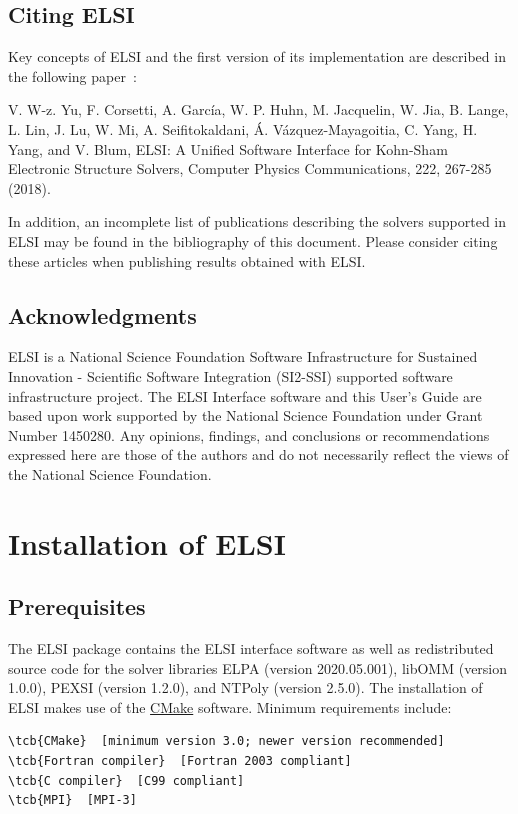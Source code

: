\documentclass{report}
\newcommand{\tcb}[1]{\textcolor{blue}{#1}}
\begin{document}
\section{Citing ELSI}
\label{sec:cite}
Key concepts of ELSI and the first version of its implementation are described in the following paper~\cite{elsi_yu_2018}:

V. W-z. Yu, F. Corsetti, A. Garc\'{i}a, W. P. Huhn, M. Jacquelin, W. Jia, B. Lange, L. Lin, J. Lu, W. Mi, A. Seifitokaldani, \'{A}. V\'{a}zquez-Mayagoitia, C. Yang, H. Yang, and V. Blum, ELSI: A Unified Software Interface for Kohn-Sham Electronic Structure Solvers, Computer Physics Communications, 222, 267-285 (2018).

In addition, an incomplete list of publications describing the solvers supported in ELSI may be found in the bibliography of this document. Please consider citing these articles when publishing results obtained with ELSI.

\section{Acknowledgments}
\label{sec:thanks}
ELSI is a National Science Foundation Software Infrastructure for Sustained Innovation - Scientific Software Integration (SI2-SSI) supported software infrastructure project. The ELSI Interface software and this User's Guide are based upon work supported by the National Science Foundation under Grant Number 1450280. Any opinions, findings, and conclusions or recommendations expressed here are those of the authors and do not necessarily reflect the views of the National Science Foundation.

\chapter{Installation of ELSI}
\section{Prerequisites}
\label{sec:prereq}
The ELSI package contains the ELSI interface software as well as redistributed source code for the solver libraries ELPA (version 2020.05.001), libOMM (version 1.0.0), PEXSI (version 1.2.0), and NTPoly (version 2.5.0). The installation of ELSI makes use of the \href{http://cmake.org}{CMake} software. Minimum requirements include:
\begin{Verbatim}[commandchars=\\\{\}]
\tcb{CMake}  [minimum version 3.0; newer version recommended]
\tcb{Fortran compiler}  [Fortran 2003 compliant]
\tcb{C compiler}  [C99 compliant]
\tcb{MPI}  [MPI-3]
\end{Verbatim}
\end{document}
